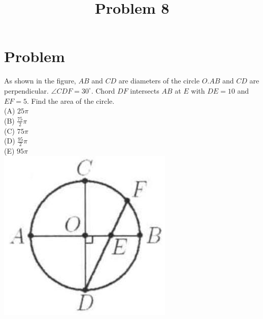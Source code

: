 \documentclass{article}
\title{Problem 8}
\date{}
\begin{document}
\maketitle

\section*{Problem}
As shown in the figure, \(A B\) and \(C D\) are diameters of the circle \(O . A B\) and \(C D\) are perpendicular. \(\angle C D F=30^{\circ}\). Chord \(D F\) intersects \(A B\) at \(E\) with \(D E=10\) and \(E F=5\). Find the area of the circle.\\
(A) \(25 \pi\)\\
(B) \(\frac{75}{2} \pi\)\\
(C) \(75 \pi\)\\
(D) \(\frac{95}{2} \pi\)\\
(E) \(95 \pi\)\\
\centering
\includegraphics[width=\textwidth]{images/problem_image_1.jpg}
\end{document}
